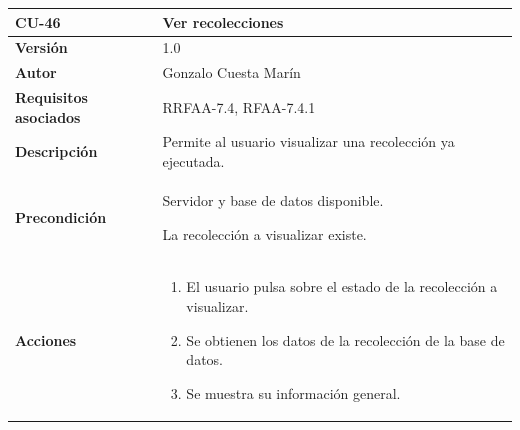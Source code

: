 \documentclass[
]{article}
\providecommand{\tightlist}{%
  \setlength{\itemsep}{0pt}\setlength{\parskip}{0pt}}
\begin{document}
\begin{longtable}[]{@{}ll@{}}
\toprule
\begin{minipage}[b]{0.25\columnwidth}\raggedright
\textbf{CU-46}\strut
\end{minipage} & \begin{minipage}[b]{0.69\columnwidth}\raggedright
\textbf{Ver recolecciones}\strut
\end{minipage}\tabularnewline
\midrule
\endhead
\begin{minipage}[t]{0.25\columnwidth}\raggedright
\textbf{Versión}\strut
\end{minipage} & \begin{minipage}[t]{0.69\columnwidth}\raggedright
1.0\strut
\end{minipage}\tabularnewline
\begin{minipage}[t]{0.25\columnwidth}\raggedright
\textbf{Autor}\strut
\end{minipage} & \begin{minipage}[t]{0.69\columnwidth}\raggedright
Gonzalo Cuesta Marín\strut
\end{minipage}\tabularnewline
\begin{minipage}[t]{0.25\columnwidth}\raggedright
\textbf{Requisitos asociados}\strut
\end{minipage} & \begin{minipage}[t]{0.69\columnwidth}\raggedright
RRFAA-7.4, RFAA-7.4.1\strut
\end{minipage}\tabularnewline
\begin{minipage}[t]{0.25\columnwidth}\raggedright
\textbf{Descripción}\strut
\end{minipage} & \begin{minipage}[t]{0.69\columnwidth}\raggedright
Permite al usuario visualizar una recolección ya ejecutada.\strut
\end{minipage}\tabularnewline
\begin{minipage}[t]{0.25\columnwidth}\raggedright
\textbf{Precondición}\strut
\end{minipage} & \begin{minipage}[t]{0.69\columnwidth}\raggedright
Servidor y base de datos disponible.

La recolección a visualizar existe.\strut
\end{minipage}\tabularnewline
\begin{minipage}[t]{0.25\columnwidth}\raggedright
\textbf{Acciones}\strut
\end{minipage} & \begin{minipage}[t]{0.69\columnwidth}\raggedright
\begin{enumerate}
\def\labelenumi{\arabic{enumi}.}
\tightlist
\item
  El usuario pulsa sobre el estado de la recolección a visualizar.
\item
  Se obtienen los datos de la recolección de la base de datos.
\item
  Se muestra su información general.


\end{enumerate}
\end{minipage}
\end{longtable}
\end{document}
